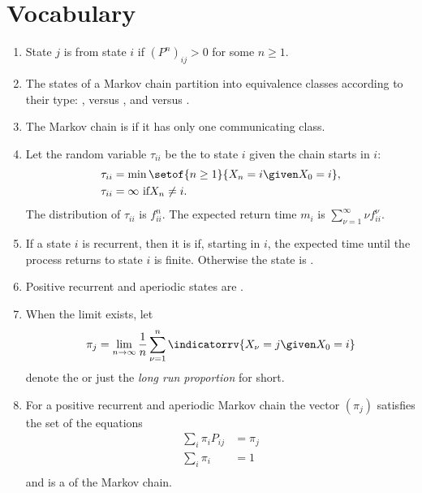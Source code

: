 \documentclass[12pt]{article}
\begin{document}
\section*{Vocabulary}
\begin{enumerate}
    \item
        State \( j \) is  from state \( i \) if \( (P^{n})_
        {ij} > 0 \) for some \( n \ge 1 \).
    \item
        The states of a Markov chain partition into equivalence classes
        according to their type:  , 
        versus , and  versus .
    \item
        The Markov chain is  if it has only one
        communicating class.
    \item
        Let the random variable \( \tau_{ii} \) be the 
        to state \( i \) given the chain starts in \( i \):
        \begin{align*}
            \tau_{ii} &= \min\setof{n \ge 1}{X_n = i \given X_0 = i}, \\
            \tau_{ii} &= \infty \text{ if} X_n \ne i.
        \end{align*}
        The distribution of \( \tau_{ii} \) is \( f^n_{ii} \). The 
        {expected return time} \( m_i \) is \( \sum_ {\nu=1}^\infty \nu
        f^\nu_{ii} \).
    \item
        If a state \( i \) is recurrent, then it is  if, starting in \( i \), the expected time until the
        process returns to state \( i \) is finite.  Otherwise the state
        is .
    \item
        Positive recurrent and aperiodic states are .
    \item
        When the limit exists, let
        \[
            \pi_j = \lim_{n \to \infty} \frac{1}{n} \sum\limits_{\nu=1}^n
            \indicatorrv{X_{\nu}= j \given X_0 = i}
        \] denote the  or just the \emph{long run proportion} for
        short.
    \item
        For a positive recurrent and aperiodic Markov chain the vector \(
        (\pi_j) \) satisfies the set of the equations
        \begin{align*}
            \sum\limits_{i} \pi_{i} P_{ij} &= \pi_{j}\\
            \sum\limits_{i} \pi_{i} &= 1 \\
        \end{align*}
        and is a  of the
        Markov chain.
\end{enumerate}
\end{document}
